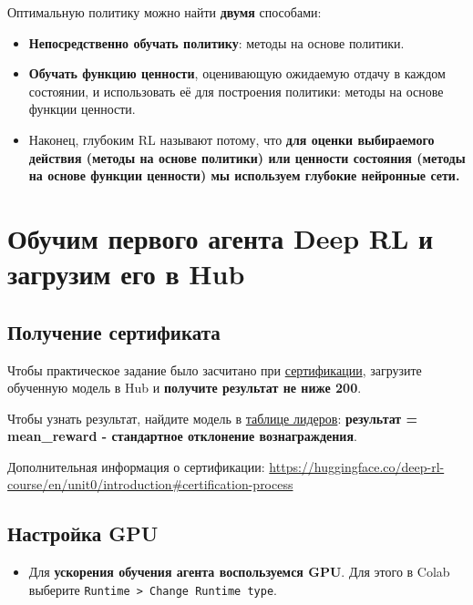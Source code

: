 \documentclass[11pt,a4paper]{article}
\begin{document}
Оптимальную политику можно найти \textbf{двумя} способами:

\begin{itemize}
\item
  \textbf{Непосредственно обучать политику}: методы на основе политики.
\item
  \textbf{Обучать функцию ценности}, оценивающую ожидаемую отдачу в каждом состоянии, и использовать её для построения политики: методы на основе функции ценности.
\item
  Наконец, глубоким RL называют потому, что \textbf{для оценки выбираемого действия (методы на основе политики) или ценности состояния (методы на основе функции ценности) мы используем глубокие нейронные сети.}
\end{itemize}

\section{Обучим первого агента Deep RL и загрузим его в Hub}\label{lets-train-our-first-deep-reinforcement-learning-agent-and-upload-it-to-the-hub}

\subsection{Получение сертификата}\label{get-a-certificate}

Чтобы практическое задание было засчитано при \href{https://huggingface.co/deep-rl-course/en/unit0/introduction\#certification-process}{сертификации}, загрузите обученную модель в Hub и \textbf{получите результат не ниже 200}.

Чтобы узнать результат, найдите модель в \href{https://huggingface.co/spaces/huggingface-projects/Deep-Reinforcement-Learning-Leaderboard}{таблице лидеров}: \textbf{результат = mean\_reward - стандартное отклонение вознаграждения}.

Дополнительная информация о сертификации: \url{https://huggingface.co/deep-rl-course/en/unit0/introduction\#certification-process}

\subsection{Настройка GPU}\label{set-the-gpu}

\begin{itemize}
\tightlist
\item
  Для \textbf{ускорения обучения агента воспользуемся GPU}. Для этого в Colab выберите \passthrough{\lstinline!Runtime > Change Runtime type!}.
\end{itemize}
\end{document}
